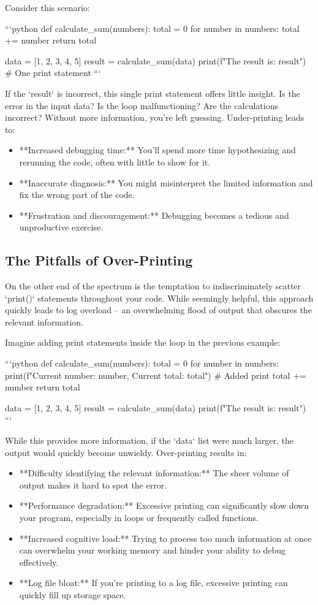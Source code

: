 \documentclass{article}
\begin{document}
{{{Consider this scenario:

```python
def calculate_sum(numbers):
    total = 0
    for number in numbers:
        total += number
    return total

data = [1, 2, 3, 4, 5]
result = calculate_sum(data)
print(f"The result is: {result}") # One print statement
```

If the `result` is incorrect, this single print statement offers little insight. Is the error in the input data? Is the loop malfunctioning? Are the calculations incorrect? Without more information, you're left guessing.  Under-printing leads to:

\begin{itemize}
    \item **Increased debugging time:** You'll spend more time hypothesizing and rerunning the code, often with little to show for it.
    \item **Inaccurate diagnosis:** You might misinterpret the limited information and fix the wrong part of the code.
    \item **Frustration and discouragement:** Debugging becomes a tedious and unproductive exercise.
\end{itemize}

\subsection*{The Pitfalls of Over-Printing}

On the other end of the spectrum is the temptation to indiscriminately scatter `print()` statements throughout your code. While seemingly helpful, this approach quickly leads to log overload – an overwhelming flood of output that obscures the relevant information.

Imagine adding print statements inside the loop in the previous example:

```python
def calculate_sum(numbers):
    total = 0
    for number in numbers:
        print(f"Current number: {number}, Current total: {total}") # Added print
        total += number
    return total

data = [1, 2, 3, 4, 5]
result = calculate_sum(data)
print(f"The result is: {result}")
```

While this provides more information, if the `data` list were much larger, the output would quickly become unwieldy. Over-printing results in:

\begin{itemize}
    \item **Difficulty identifying the relevant information:**  The sheer volume of output makes it hard to spot the error.
    \item **Performance degradation:**  Excessive printing can significantly slow down your program, especially in loops or frequently called functions.
    \item **Increased cognitive load:**  Trying to process too much information at once can overwhelm your working memory and hinder your ability to debug effectively.
    \item **Log file bloat:**  If you're printing to a log file, excessive printing can quickly fill up storage space.
\end{itemize}

}}}
\end{document}
